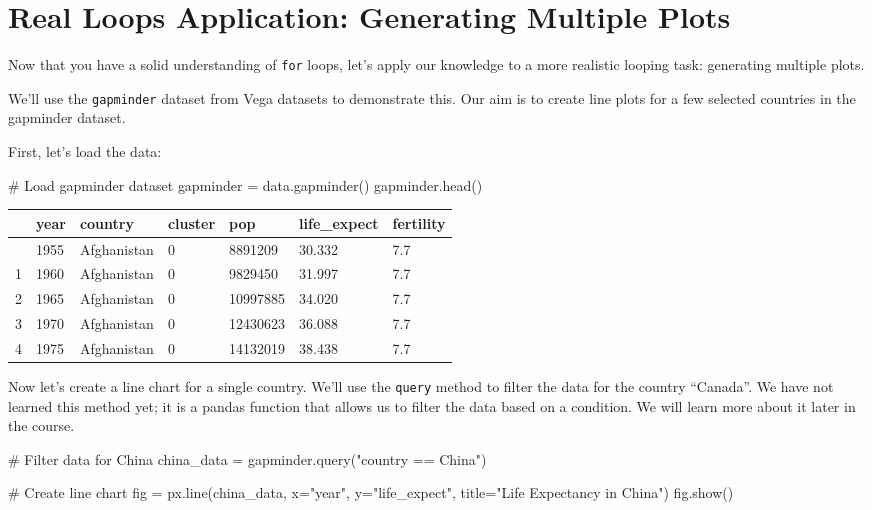 \documentclass[
  letterpaper,
  DIV=11,
  numbers=noendperiod]{scrreprt}
\newenvironment{Shaded}{\begin{snugshade}}{\end{snugshade}}
\newcommand{\CommentTok}[1]{\textcolor[rgb]{0.37,0.37,0.37}{#1}}
\newcommand{\NormalTok}[1]{\textcolor[rgb]{0.00,0.23,0.31}{#1}}
\newcommand{\OperatorTok}[1]{\textcolor[rgb]{0.37,0.37,0.37}{#1}}
\newcommand{\StringTok}[1]{\textcolor[rgb]{0.13,0.47,0.30}{#1}}
\begin{document}
\chapter{Real Loops Application: Generating Multiple
Plots}\label{real-loops-application-generating-multiple-plots}

Now that you have a solid understanding of \texttt{for} loops, let's
apply our knowledge to a more realistic looping task: generating
multiple plots.

We'll use the \texttt{gapminder} dataset from Vega datasets to
demonstrate this. Our aim is to create line plots for a few selected
countries in the gapminder dataset.

First, let's load the data:

\begin{Shaded}
\begin{Highlighting}[]
\CommentTok{\# Load gapminder dataset}
\NormalTok{gapminder }\OperatorTok{=}\NormalTok{ data.gapminder()}
\NormalTok{gapminder.head()}
\end{Highlighting}
\end{Shaded}

\begin{longtable}[]{@{}lllllll@{}}
\toprule\noalign{}
& year & country & cluster & pop & life\_expect & fertility \\
\midrule\noalign{}
\endhead
\bottomrule\noalign{}
\endlastfoot
0 & 1955 & Afghanistan & 0 & 8891209 & 30.332 & 7.7 \\
1 & 1960 & Afghanistan & 0 & 9829450 & 31.997 & 7.7 \\
2 & 1965 & Afghanistan & 0 & 10997885 & 34.020 & 7.7 \\
3 & 1970 & Afghanistan & 0 & 12430623 & 36.088 & 7.7 \\
4 & 1975 & Afghanistan & 0 & 14132019 & 38.438 & 7.7 \\
\end{longtable}

Now let's create a line chart for a single country. We'll use the
\texttt{query} method to filter the data for the country ``Canada''. We
have not learned this method yet; it is a pandas function that allows us
to filter the data based on a condition. We will learn more about it
later in the course.

\begin{Shaded}
\begin{Highlighting}[]
\CommentTok{\# Filter data for China}
\NormalTok{china\_data }\OperatorTok{=}\NormalTok{ gapminder.query(}\StringTok{"country == \textquotesingle{}China\textquotesingle{}"}\NormalTok{)}

\CommentTok{\# Create line chart}
\NormalTok{fig }\OperatorTok{=}\NormalTok{ px.line(china\_data, x}\OperatorTok{=}\StringTok{"year"}\NormalTok{, y}\OperatorTok{=}\StringTok{"life\_expect"}\NormalTok{, title}\OperatorTok{=}\StringTok{"Life Expectancy in China"}\NormalTok{)}
\NormalTok{fig.show()}
\end{Highlighting}
\end{Shaded}
\end{document}
